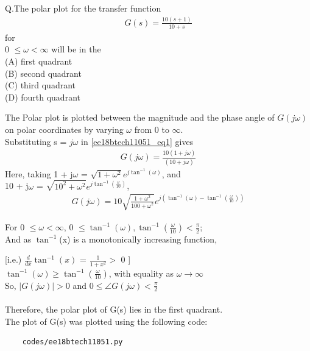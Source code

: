\begin{enumerate}[label=\thesection.\arabic*.,ref=\thesection.\theenumi]

\begin{frame}

   Q.The polar plot for the transfer function
\begin{align}
\label{ee18btech11051_eq1}
     G(s) = \frac{10(s+1)}{10+s}
\end{align} for \\0 $\leq \omega < \infty$ will be in the \\
(A) first quadrant\\
(B) second quadrant\\
(C) third quadrant\\
(D) fourth quadrant\\
\end{frame}

\begin{frame}
    The Polar plot is plotted between the magnitude and the phase angle of $G(j\omega)$ on polar coordinates by varying $\omega$ from 0 to $\infty$.
\\

  Substituting s = $j \omega$ in \eqref{ee18btech11051_eq1} gives 
\begin{align}
\label{ee18btech11051_eq2}
G(j\omega) = \frac{10(1+j\omega)}{(10+j\omega)}
\end{align}
Here, taking 1 + j$\omega$ = $\sqrt{1+{\omega}^2}e^{j\tan^{-1}(\omega)}$,
 and\\ 10 + j$\omega$ = $\sqrt{10^{2}+{\omega}^2}e^{j\tan^{-1}(\frac{\omega}{10})}$,
 \begin{align}
 \label{ee18btech11051_eq3}
G(j\omega) = 10\sqrt{\frac{1+\omega^2}{100+\omega^2}}e^{j(\tan^{-1}(\omega)-\tan^{-1}(\frac{\omega}{10}))}
\end{align}

For 0 $\leq \omega < \infty$,  0 $\leq \tan^{-1}(\omega), \tan^{-1}(\frac{\omega}{10}) < \frac{\pi}{2}$;\\
And as $\tan^{-1}$(x) is a monotonically increasing function,

[i.e.) $\frac{d}{dx}\tan^{-1}(x)$ = $\frac{1}{1+x^2} >$  0  ]\\
$\tan^{-1}(\omega) \geq \tan^{-1}(\frac{\omega}{10}) $, with equality as $\omega \rightarrow \infty$\\
So, $|G(j\omega)| > 0 $ and $0 \leq \angle G(j\omega) < \frac{\pi}{2}$
\\~\\ Therefore, the polar plot of G(s) lies in the first quadrant. \\ The plot of G(s) was plotted using the following code:
\begin{lstlisting}
    codes/ee18btech11051.py
\end{lstlisting}


\end{frame}
\end{enumerate}
